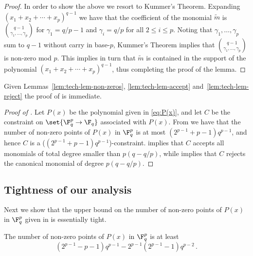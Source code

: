 \begin{proof}
In order to show the above we resort to Kummer's Theorem. Expanding $(x_1+x_2+ \cdots + x_p)^{q-1}$ we have that the coefficient of the monomial $\widetilde m$ is
$\binom {q-1}  {\gamma_1, \ldots, \gamma_p}$ for $\gamma_1 = q/p -1$ and $\gamma_i = q/p$ for all $2 \leq i \leq p$. Noting that $\gamma_1, \ldots, \gamma_p$ sum to $q-1$ without carry in base-$p$, Kummer's Theorem implies that $\binom {q-1}  {\gamma_1, \ldots, \gamma_p}$ is non-zero mod $p$. This implies in turn that $\widetilde m$ is contained in the support of the polynomial $(x_1+x_2+ \cdots + x_p)^{q-1}$, thus completing the proof of the lemma.
 \end{proof}

 Given Lemmas~\ref{lem:tech-lem-non-zeros}, \ref{lem:tech-lem-accept} and~\ref{lem:tech-lem-reject} the proof of  is immediate.

 \begin{proof}[Proof of ]
Let $P(x)$ be the polynomial given in \eqref{eq:P(x)}, and let $C$ be the constraint on $\set{\F_q^p \to \F_q}$ associated with $P(x)$. {}From 
we have that the number of non-zero points of $P(x)$ in $\F_q^p$ is at most $(2^{p-1} + p-1)q^{p-1}$, and hence $C$ is a
($(2^{p-1}+p-1)q^{p-1}$)-constraint.  implies that $C$ accepts all monomials of total degree smaller
than $p(q-q/p)$, while  implies that $C$ rejects the canonical monomial of degree $p(q-q/p)$.
 \end{proof}

\subsection{Tightness of our analysis}

Next we show that the upper bound on the number of non-zero points of $P(x)$ in $\F_q^p$ given in 
is essentially tight.

\begin{lemma}\label{lem:tech-lem-non-zeros-lb}
The number of non-zero points of $P(x)$ in $\F_q^p$ is at least \[(2^{p-1}-p-1)q^{p-1} - 2^{p-1}(2^{p-1}-1)q^{p-2} \,.\]
\end{lemma}

